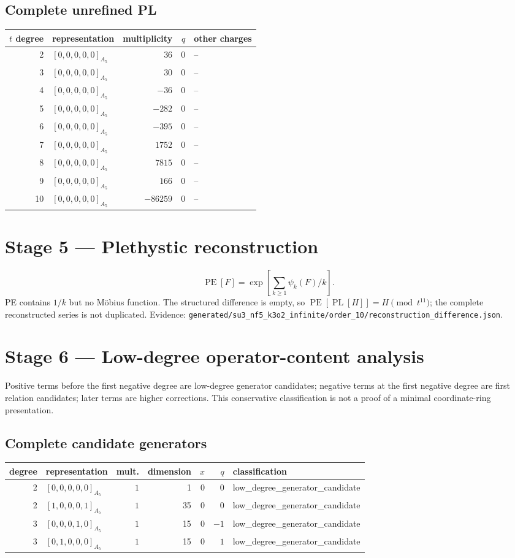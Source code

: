 \documentclass[11pt]{article}
\newcommand{\Dynkin}[1]{#1}
\newcommand{\RawPath}[1]{\texttt{#1}}
\begin{document}
\subsection{Complete unrefined PL}
\begin{longtable}{r l r r l}
\toprule $t$ degree & representation & multiplicity & $q$ & other charges\\\midrule\endhead
2 & $\Dynkin{[0,0,0,0,0]_{A_5}}$ & $36$ & $0$ & --\\
3 & $\Dynkin{[0,0,0,0,0]_{A_5}}$ & $30$ & $0$ & --\\
4 & $\Dynkin{[0,0,0,0,0]_{A_5}}$ & $-36$ & $0$ & --\\
5 & $\Dynkin{[0,0,0,0,0]_{A_5}}$ & $-282$ & $0$ & --\\
6 & $\Dynkin{[0,0,0,0,0]_{A_5}}$ & $-395$ & $0$ & --\\
7 & $\Dynkin{[0,0,0,0,0]_{A_5}}$ & $1752$ & $0$ & --\\
8 & $\Dynkin{[0,0,0,0,0]_{A_5}}$ & $7815$ & $0$ & --\\
9 & $\Dynkin{[0,0,0,0,0]_{A_5}}$ & $166$ & $0$ & --\\
10 & $\Dynkin{[0,0,0,0,0]_{A_5}}$ & $-86259$ & $0$ & --\\
\bottomrule\end{longtable}
\section{Stage 5 --- Plethystic reconstruction}
\[\operatorname{PE}[F]=\exp[\sum_{k\geq1}\psi_k(F)/k].\] PE contains $1/k$ but no M\"obius function. The structured difference is empty, so $\operatorname{PE}[\operatorname{PL}[H]]=H\pmod{t^{11}}$; the complete reconstructed series is not duplicated.
Evidence: \RawPath{generated/su3\_nf5\_k3o2\_infinite/order\_10/reconstruction\_difference.json}.
\section{Stage 6 --- Low-degree operator-content analysis}
Positive terms before the first negative degree are low-degree generator candidates; negative terms at the first negative degree are first relation candidates; later terms are higher corrections. This conservative classification is not a proof of a minimal coordinate-ring presentation.
\subsection{Complete candidate generators}
\begin{longtable}{r l r r r r l}
\toprule degree & representation & mult. & dimension & $x$ & $q$ & classification\\\midrule\endhead
2 & $\Dynkin{[0,0,0,0,0]_{A_5}}$ & $1$ & 1 & $0$ & $0$ & low\_degree\_generator\_candidate\\
2 & $\Dynkin{[1,0,0,0,1]_{A_5}}$ & $1$ & 35 & $0$ & $0$ & low\_degree\_generator\_candidate\\
3 & $\Dynkin{[0,0,0,1,0]_{A_5}}$ & $1$ & 15 & $0$ & $-1$ & low\_degree\_generator\_candidate\\
3 & $\Dynkin{[0,1,0,0,0]_{A_5}}$ & $1$ & 15 & $0$ & $1$ & low\_degree\_generator\_candidate\\
\bottomrule\end{longtable}
\end{document}
